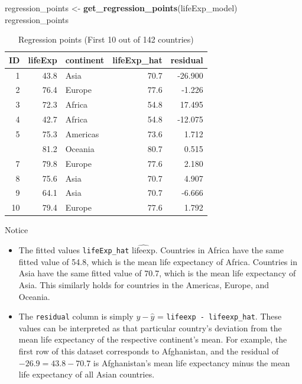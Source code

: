 \documentclass[12pt, krantz2,]{krantz}
\makeatletter
\newenvironment{Shaded}{\begin{snugshade}}{\end{snugshade}}
\newcommand{\KeywordTok}[1]{\textcolor[rgb]{0.27,0.27,0.27}{\textbf{#1}}}
\newcommand{\NormalTok}[1]{#1}
\newcommand{\StringTok}[1]{\textcolor[rgb]{0.5,0.5,0.5}{#1}}
\providecommand{\tightlist}{%
  \setlength{\itemsep}{0pt}\setlength{\parskip}{0pt}}
\newenvironment{kframe}{%
\medskip{}
\setlength{\fboxsep}{.8em}
 \def\at@end@of@kframe{}%
 \ifinner\ifhmode%
  \def\at@end@of@kframe{\end{minipage}}%
  \begin{minipage}{\columnwidth}%
 \fi\fi%
 \def\FrameCommand##1{\hskip\@totalleftmargin \hskip-\fboxsep
 \colorbox{shadecolor}{##1}\hskip-\fboxsep
     \hskip-\linewidth \hskip-\@totalleftmargin \hskip\columnwidth}%
 \MakeFramed {\advance\hsize-\width
   \@totalleftmargin\z@ \linewidth\hsize
   \@setminipage}}%
 {\par\unskip\endMakeFramed%
 \at@end@of@kframe}
\renewenvironment{Shaded}{\begin{kframe}}{\end{kframe}}
\makeatother
\begin{document}
\begin{Shaded}
\begin{Highlighting}[]
\NormalTok{regression_points <-}\StringTok{ }\KeywordTok{get_regression_points}\NormalTok{(lifeExp_model)}
\NormalTok{regression_points}
\end{Highlighting}
\end{Shaded}

\begin{table}[H]

\caption{\label{tab:unnamed-chunk-181}Regression points (First 10 out of 142 countries)}
\centering
\fontsize{10}{12}\selectfont
\begin{tabular}{rrlrr}
\toprule
ID & lifeExp & continent & lifeExp\_hat & residual\\
\midrule
1 & 43.8 & Asia & 70.7 & -26.900\\
2 & 76.4 & Europe & 77.6 & -1.226\\
3 & 72.3 & Africa & 54.8 & 17.495\\
4 & 42.7 & Africa & 54.8 & -12.075\\
5 & 75.3 & Americas & 73.6 & 1.712\\
\addlinespace
6 & 81.2 & Oceania & 80.7 & 0.515\\
7 & 79.8 & Europe & 77.6 & 2.180\\
8 & 75.6 & Asia & 70.7 & 4.907\\
9 & 64.1 & Asia & 70.7 & -6.666\\
10 & 79.4 & Europe & 77.6 & 1.792\\
\bottomrule
\end{tabular}
\end{table}

Notice

\begin{itemize}
\tightlist
\item
  The fitted values \texttt{lifeExp\_hat} \(\widehat{\text{lifeexp}}\). Countries in Africa have the
  same fitted value of 54.8, which is the mean life expectancy of Africa. Countries in Asia have the same fitted value of 70.7, which is the mean life
  expectancy of Asia. This similarly holds for countries in the Americas, Europe,
  and Oceania.
\item
  The \texttt{residual} column is simply \(y - \widehat{y}\) = \texttt{lifeexp\ -\ lifeexp\_hat}.
  These values can be interpreted as that particular country's deviation from the
  mean life expectancy of the respective continent's mean. For example, the first
  row of this dataset corresponds to Afghanistan, and the residual of
  \(-26.9 = 43.8 - 70.7\) is Afghanistan's mean life expectancy minus the mean life
  expectancy of all Asian countries.
\end{itemize}
\end{document}
